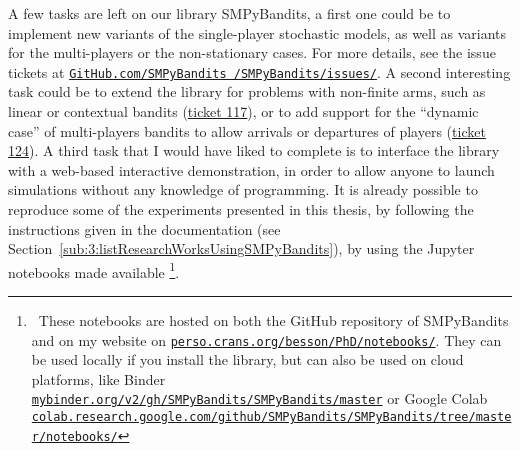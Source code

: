 A few tasks are left on our library SMPyBandits, a first one could be to implement new variants of the single-player stochastic models, as well as variants for the multi-players or the non-stationary cases.
For more details, see the issue tickets at \href{https://github.com/SMPyBandits/SMPyBandits/issues/}{\texttt{GitHub.com/SMPyBandits /SMPyBandits/issues/}}.
%
A second interesting task could be to extend the library for problems with non-finite arms, such as linear or contextual bandits (\href{https://github.com/SMPyBandits/SMPyBandits/issues/117}{ticket 117}),
or to add support for the ``dynamic case'' of multi-players bandits to allow arrivals or departures of players (\href{https://github.com/SMPyBandits/SMPyBandits/issues/124}{ticket 124}).
%
A third task that I would have liked to complete is to interface the library with a web-based interactive demonstration, in order to allow anyone to launch simulations without any knowledge of programming.
It is already possible to reproduce some of the experiments presented in this thesis,
by following the instructions given in the documentation (see Section~\ref{sub:3:listResearchWorksUsingSMPyBandits}),
by using the Jupyter notebooks \cite{jupyter} made available%
\footnote{~These notebooks are hosted on both the GitHub repository of SMPyBandits and on my website on \href{https://perso.crans.org/besson/PhD/notebooks/}{\texttt{perso.crans.org/besson/PhD/notebooks/}}. They can be used locally if you install the library, but can also be used on cloud platforms, like Binder \href{https://mybinder.org/v2/gh/SMPyBandits/SMPyBandits/master}{\texttt{mybinder.org/v2/gh/SMPyBandits/SMPyBandits/master}} or Google Colab \href{https://colab.research.google.com/github/SMPyBandits/SMPyBandits/tree/master/notebooks/}{\texttt{colab.research.google.com/github/SMPyBandits/SMPyBandits/tree/master/notebooks/}}}.







